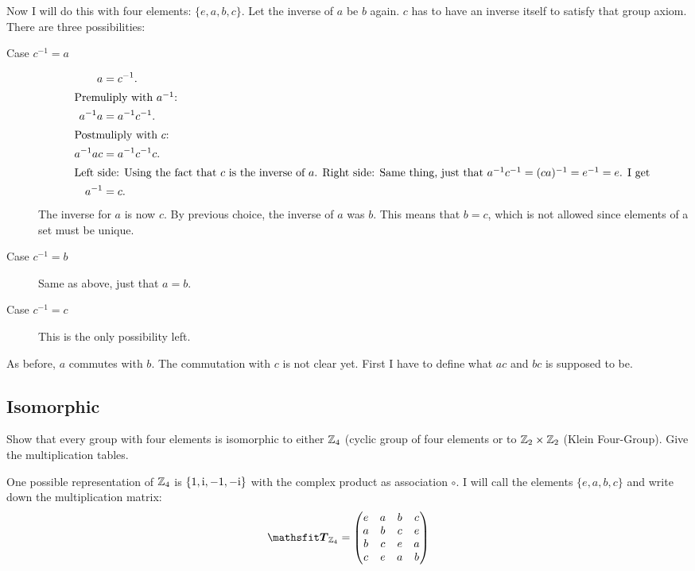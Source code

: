\documentclass[11pt, ngerman, fleqn, DIV=15, headinclude, BCOR=1cm]{scrartcl}
\newcommand\inv{^{-1}}
\begin{document}
Now I will do this with four elements: $\{e, a, b, c\}$. Let the inverse of $a$
be $b$ again. $c$ has to have an inverse itself to satisfy that group axiom.
There are three possibilities:

\begin{description}
    \item[Case $c\inv = a$]
        \begin{align*}
            a &= c\inv. \\
            \intertext{%
                Premuliply with $a\inv$:
            }
            a\inv a &= a\inv c\inv. \\
            \intertext{%
                Postmuliply with $c$:
            }
            a\inv a c &= a\inv c\inv c. \\
            \intertext{%
                Left side: Using the fact that $c$ is the inverse of $a$. Right
                side: Same thing, just that $a\inv c\inv = (ca)\inv = e\inv =
                e$. I get
            }
            a\inv &= c.
        \end{align*}
        The inverse for $a$ is now $c$. By previous choice, the inverse of $a$
        was $b$. This means that $b = c$, which is not allowed since elements
        of a set must be unique.

    \item[Case $c\inv = b$]
        Same as above, just that $a = b$.

    \item[Case $c\inv = c$]
        This is the only possibility left.
\end{description}

As before, $a$ commutes with $b$. The commutation with $c$ is not clear yet.
First I have to define what $ac$ and $bc$ is supposed to be.

\subsection{Isomorphic}

\begin{problem}
    Show that every group with four elements is isomorphic to either $\mathbb Z_4$
    (cyclic group of four elements or to $\mathbb Z_2 \times \mathbb Z_2$ (Klein Four-Group).
    Give the multiplication tables.
\end{problem}

One possible representation of $\mathbb Z_4$ is $\{1, \mathrm i, -1, -\mathrm i\}$ with the
complex product as association $\circ$. I will call the elements $\{e, a, b,
c\}$ and write down the multiplication matrix:
\[
    \tens T_{\Z_4} =
    \begin{pmatrix}
        e & a & b & c \\
        a & b & c & e \\
        b & c & e & a \\
        c & e & a & b
    \end{pmatrix}
\]
\end{document}
